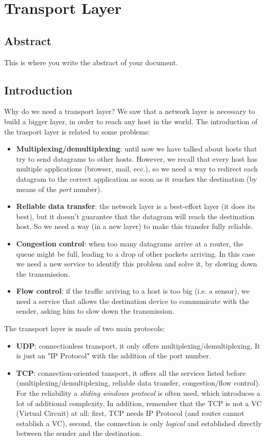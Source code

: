 \chapter[Transport Layer]{Transport Layer}

\section*{Abstract}         %
This is where you write the abstract of your document.

\section{Introduction}
Why do we need a transport layer? We saw that a network layer is necessary to build a bigger layer, in order to reach any host in the world. The introduction of the trasport layer is related to some problems:
\begin{itemize}
    \item \textbf{Multiplexing/demultiplexing}: until now we have talked about hosts that try to send datagrams to other hosts. However, we recall that every host has multiple applications (browser, mail, ecc.), so we need a way to redirect each datagram to the correct application as soon as it reaches the destination (by means of the \textit{port} number).
    \item \textbf{Reliable data transfer}: the network layer is a best-effort layer (it does its best), but it doesn't guarantee that the datagram will reach the destination host. So we need a way (in a new layer) to make this transfer fully reliable.
    \item \textbf{Congestion control}: when too many datagrams arrive at a router, the queue might be full, leading to a drop of other packets arriving. In this case we need a new service to identify this problem and solve it, by slowing down the transmission.
    \item \textbf{Flow control}: if the traffic arriving to a host is too big (i.e. a sensor), we need a service that allows the destination device to communicate with the sender, asking him to slow down the transmission.
\end{itemize}

\noindent The transport layer is made of two main protocols:
\begin{itemize}
    \item \textbf{UDP}: connectionless transport, it only offers multiplexing/demultiplexing. It is just an "IP Protocol" with the addition of the port number.
    \item \textbf{TCP}: connection-oriented tansport, it offers all the services listed before (multiplexing/demultiplexing, reliable data transfer, congestion/flow control). For the reliability a \textit{sliding windows protocol} is often used, which introduces a lot of additional complexity. In addition, remember that the TCP is not a VC (Virtual Circuit) at all: first, TCP needs IP Protocol (and router cannot establish a VC), second, the connection is only \textit{logical} and established directly between the sender and the destination.
\end{itemize}

